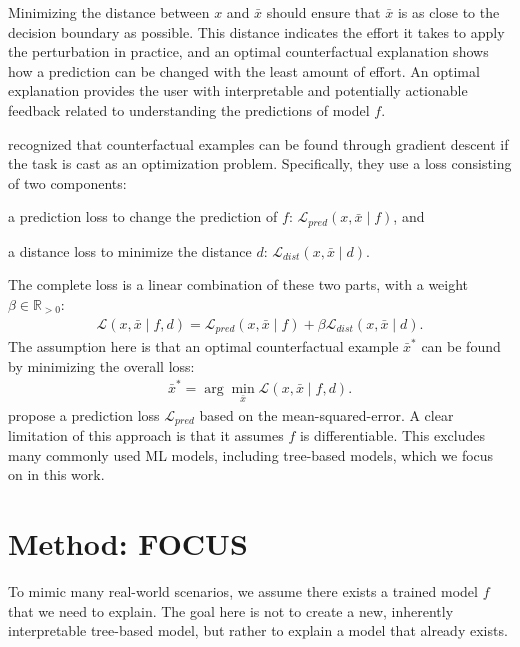 Minimizing the distance between $x$ and $\bar{x}$ should ensure that $\bar{x}$ is as close to the decision boundary as possible. 
This distance indicates the effort it takes to apply the perturbation in practice, and an optimal counterfactual explanation shows how a prediction can be changed with the least amount of effort.
An optimal explanation provides the user with interpretable and potentially actionable feedback related to understanding the predictions of model $f$. 


\citet{wachter_counterfactual_2017} recognized that counterfactual examples can be found through gradient descent if the task is cast as an optimization problem.
Specifically, they use a loss consisting of two components: 
\begin{enumerate*}[label=(\roman*)]
	\item a prediction loss to change the prediction of $f$: $\mathcal{L}_{pred}(x, \bar{x} \mid f)$, and
	\item a distance loss to minimize the distance $d$: $\mathcal{L}_{dist}(x, \bar{x} \mid d)$.
\end{enumerate*}
The complete loss is a linear combination of these two parts, with a weight $\beta \in \mathbb{R}_{>0}$:
\begin{align}
\label{eq:mainloss}
\mathcal{L}(x, \bar{x} \mid f, d) = \mathcal{L}_{pred}(x, \bar{x} \mid f) + \beta \mathcal{L}_{dist}(x, \bar{x} \mid d).
\end{align}
The assumption here is that an optimal counterfactual example $\bar{x}^*$ can be found by minimizing the overall loss:
\begin{align}
\bar{x}^* = \arg\min_{\bar{x}} \mathcal{L}(x, \bar{x} \mid f, d).
\end{align}
\citet{wachter_counterfactual_2017} propose a prediction loss $\mathcal{L}_{pred}$ based on the mean-squared-error. 
A clear limitation of this approach is that it assumes $f$ is differentiable.
This excludes many commonly used ML models, including tree-based models, which we focus on in this work.


\section{Method: FOCUS}
\label{section:focus-method}
To mimic many real-world scenarios, we assume there exists a trained model $f$ that we need to explain. The goal here is not to create a new, inherently interpretable tree-based model, but rather to explain a model that already exists. 


